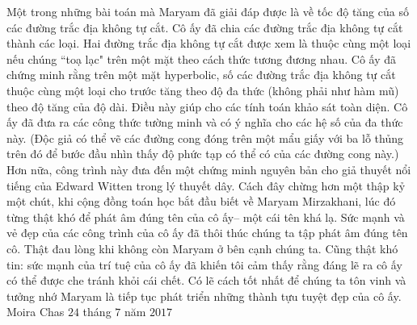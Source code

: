 \begin{multicols}{2}
	\vskip 0.1cm
	Một trong những bài toán mà Maryam đã giải đáp được là về tốc độ tăng của số các đường trắc địa không tự cắt. Cô ấy đã chia các đường trắc địa không tự cắt thành các loại. Hai đường trắc địa không tự cắt được xem là thuộc cùng một loại nếu chúng ``toạ lạc" trên một mặt theo cách thức tương đương nhau.
	\vskip 0.1cm
	Cô ấy đã chứng minh rằng trên một mặt \linebreak hyperbolic, số các đường trắc địa không tự cắt thuộc cùng một loại cho trước {\color[named]{codienhiendai}tăng theo độ} đa thức (không phải như hàm mũ) {\color[named]{codienhiendai}theo độ} tăng của độ dài. Điều này giúp cho các \linebreak tính toán khảo sát {\color[named]{codienhiendai}toàn diện}. Cô ấy đã đưa ra các công thức tường minh và có ý nghĩa cho các hệ số của đa thức này. (Độc giả có thể vẽ các đường cong đóng trên một mẩu giấy với ba lỗ thủng trên đó để bước đầu nhìn thấy độ phức tạp có thể có của các đường cong này.) Hơn nữa, công trình này đưa đến một chứng minh nguyên bản cho giả thuyết nổi tiếng của Edward Witten trong lý thuyết {\color[named]{codienhiendai}dây}.
	\vskip 0.1cm
	Cách đây {\color[named]{codienhiendai}chừng} hơn một thập kỷ một chút, khi cộng đồng toán học bắt đầu biết về \linebreak Maryam Mirzakhani, lúc đó {\color[named]{codienhiendai}từng thật} khó để phát âm đúng tên của cô ấy-- một cái tên {\color[named]{codienhiendai}khá} lạ. Sức mạnh và vẻ đẹp của các công trình của cô ấy đã thôi thúc chúng ta tập phát âm đúng tên cô. Thật đau lòng khi không còn Maryam ở bên {\color[named]{codienhiendai}cạnh} chúng ta. Cũng thật khó tin: sức mạnh của trí tuệ của cô ấy đã khiến tôi cảm thấy rằng đáng lẽ ra cô ấy có thể {\color[named]{codienhiendai}được che tránh} khỏi cái chết.
	\vskip 0.1cm
	Có lẽ cách tốt nhất để chúng ta tôn vinh và tưởng nhớ Maryam là tiếp tục phát triển những thành tựu tuyệt đẹp của cô ấy.
	\vskip 0.1cm
	\hfill Moira Chas
	\vskip 0.1cm
	\hfill $24$ tháng $7$ năm $2017$
\end{multicols}



